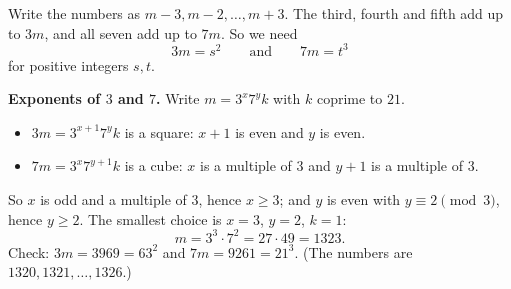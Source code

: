 Write the numbers as $m-3,m-2,\dots,m+3$. The third, fourth and fifth add up to $3m$, and all seven add up to $7m$. So we need
\[
3m=s^2\qquad\text{and}\qquad7m=t^3
\]
for positive integers $s,t$.

\textbf{Exponents of $3$ and $7$.} Write $m=3^x7^yk$ with $k$ coprime to $21$.
\begin{itemize}
\item $3m=3^{x+1}7^yk$ is a square: $x+1$ is even and $y$ is even.
\item $7m=3^x7^{y+1}k$ is a cube: $x$ is a multiple of $3$ and $y+1$ is a multiple of $3$.
\end{itemize}
So $x$ is odd and a multiple of $3$, hence $x\ge3$; and $y$ is even with $y\equiv2\pmod3$, hence $y\ge2$. The smallest choice is $x=3$, $y=2$, $k=1$:
\[
m=3^3\cdot7^2=27\cdot49=\boxed{1323}.
\]
Check: $3m=3969=63^2$ and $7m=9261=21^3$. (The numbers are $1320,1321,\dots,1326$.)
